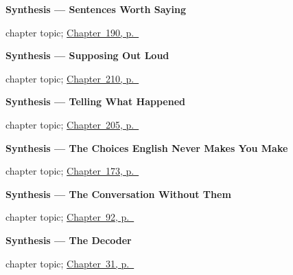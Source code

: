 \noindent\begin{minipage}[t]{\linewidth}
\raggedright
\textbf{Synthesis --- Sentences Worth Saying}\par
\footnotesize chapter topic; \hyperref[ch:synthesis-relative]{Chapter~190, p.~\pageref*{ch:synthesis-relative}}
\end{minipage}\par\smallskip

\noindent\begin{minipage}[t]{\linewidth}
\raggedright
\textbf{Synthesis --- Supposing Out Loud}\par
\footnotesize chapter topic; \hyperref[ch:sintesis-condiciones]{Chapter~210, p.~\pageref*{ch:sintesis-condiciones}}
\end{minipage}\par\smallskip

\noindent\begin{minipage}[t]{\linewidth}
\raggedright
\textbf{Synthesis --- Telling What Happened}\par
\footnotesize chapter topic; \hyperref[ch:sintesis-preterito-completo]{Chapter~205, p.~\pageref*{ch:sintesis-preterito-completo}}
\end{minipage}\par\smallskip

\noindent\begin{minipage}[t]{\linewidth}
\raggedright
\textbf{Synthesis --- The Choices English Never Makes You Make}\par
\footnotesize chapter topic; \hyperref[ch:spanish-synthesis-verb-splits]{Chapter~173, p.~\pageref*{ch:spanish-synthesis-verb-splits}}
\end{minipage}\par\smallskip

\noindent\begin{minipage}[t]{\linewidth}
\raggedright
\textbf{Synthesis --- The Conversation Without Them}\par
\footnotesize chapter topic; \hyperref[ch:synthesis-without-repeating]{Chapter~92, p.~\pageref*{ch:synthesis-without-repeating}}
\end{minipage}\par\smallskip

\noindent\begin{minipage}[t]{\linewidth}
\raggedright
\textbf{Synthesis --- The Decoder}\par
\footnotesize chapter topic; \hyperref[ch:synthesis-sound-laws]{Chapter~31, p.~\pageref*{ch:synthesis-sound-laws}}
\end{minipage}\par\smallskip

